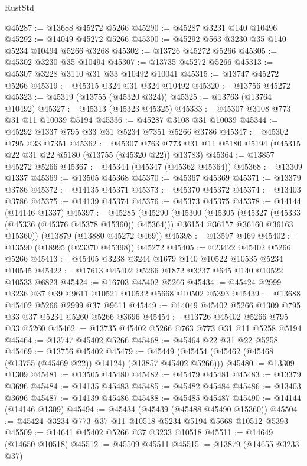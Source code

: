\begin{lexlean}{RustStd}
\begin{coremodule}
@45287 := @13688 @45272 @5266
@45290 := @45287 @3231 @140 @10496
@45292 := @14049 @45272 @5266
@45300 := @45292 @563 @3230 @35 @140 @5234 @10494 @5266 @3268
@45302 := @13726 @45272 @5266
@45305 := @45302 @3230 @35 @10494
@45307 := @13735 @45272 @5266
@45313 := @45307 @3228 @3110 @31 @33 @10492 @10041
@45315 := @13747 @45272 @5266
@45319 := @45315 @324 @31 @324 @10492
@45320 := @13756 @45272
@45323 := @45319 (@13755 (@45320 @324))
@45325 := @13763 (@13764 @10492)
@45327 := @45313 (@45323 @45325)
@45333 := @45307 @3108 @773 @31 @11 @10039 @5194
@45336 := @45287 @3108 @31 @10039
@45344 := @45292 @1337 @795 @33 @31 @5234 @7351 @5266 @3786
@45347 := @45302 @795 @33 @7351
@45362 := @45307
    @763
    @773
    @31
    @11
    @5180
    @5194
    (@45315 @22 @31 @22 @5180 (@13755 (@45320 @22)) @13783)
@45364 := @13857 @45272 @5266
@45367 := @45344 (@45347 (@45362 @45364))
@45368 := @13309 @1337
@45369 := @13505 @45368
@45370 := @45367 @45369
@45371 := @13379 @3786
@45372 := @14135 @45371
@45373 := @45370 @45372
@45374 := @13403 @3786
@45375 := @14139 @45374
@45376 := @45373 @45375
@45378 := @14144 (@14146 @1337)
@45397 := @45285
    (@45290
      (@45300
        (@45305 (@45327 (@45333 (@45336 (@45376 @45378 @15360)) @45364)))
        @36154
        @36157
        @36160
        @36163
        @15360))
    (@13879 (@13880 @45272 @469))
@45398 := @13597 @469
@45402 := @13590 (@18995 (@23370 @45398)) @45272
@45405 := @23422 @45402 @5266 @5266
@45413 := @45405 @3238 @3244 @1679 @140 @10522 @10535 @5234 @10545
@45422 := @17613 @45402 @5266 @1872 @3237 @645 @140 @10522 @10533 @6823
@45424 := @16703 @45402 @5266
@45434 := @45424 @2999 @3236 @37 @39 @9611 @10521 @10532 @5668 @10502 @5393
@45439 := @13688 @45402 @5266 @2999 @37 @9611
@45449 := @14049 @45402 @5266 @1309 @795 @33 @37 @5234 @5260 @5266 @3696
@45454 := @13726 @45402 @5266 @795 @33 @5260
@45462 := @13735 @45402 @5266 @763 @773 @31 @11 @5258 @5194
@45464 := @13747 @45402 @5266
@45468 := @45464 @22 @31 @22 @5258
@45469 := @13756 @45402
@45479 := @45449 (@45454 (@45462 (@45468 (@13755 (@45469 @22)) @14124) (@13857 @45402 @5266)))
@45480 := @13309 @1309
@45481 := @13505 @45480
@45482 := @45479 @45481
@45483 := @13379 @3696
@45484 := @14135 @45483
@45485 := @45482 @45484
@45486 := @13403 @3696
@45487 := @14139 @45486
@45488 := @45485 @45487
@45490 := @14144 (@14146 @1309)
@45494 := @45434 (@45439 (@45488 @45490 @15360))
@45504 := @45424 @3234 @773 @37 @11 @10518 @5234 @5194 @5668 @10512 @5393
@45509 := @14641 @45402 @5266 @37 @3233 @10518
@45511 := @14649 (@14650 @10518)
@45512 := @45509 @45511
@45515 := @13879 (@14655 @3233 @37)

\end{coremodule}
\end{lexlean}

